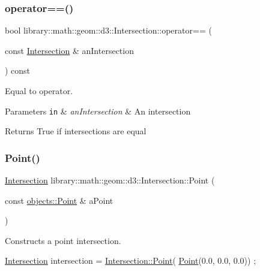 \subsubsection{\texorpdfstring{operator==()}{operator==()}}
{\footnotesize\ttfamily bool library\+::math\+::geom\+::d3\+::\+Intersection\+::operator== (\begin{DoxyParamCaption}\item[{const \hyperlink{classlibrary_1_1math_1_1geom_1_1d3_1_1_intersection}{Intersection} \&}]{an\+Intersection }\end{DoxyParamCaption}) const}



Equal to operator. 


\begin{DoxyParams}[1]{Parameters}
\mbox{\tt in}  & {\em an\+Intersection} & An intersection \\
\hline
\end{DoxyParams}
\begin{DoxyReturn}{Returns}
True if intersections are equal 
\end{DoxyReturn}
\mbox{\label{classlibrary_1_1math_1_1geom_1_1d3_1_1_intersection_a5155cc245bd2bf96a4296b0a8319c709}} 
\subsubsection{\texorpdfstring{Point()}{Point()}}
{\footnotesize\ttfamily \hyperlink{classlibrary_1_1math_1_1geom_1_1d3_1_1_intersection}{Intersection} library\+::math\+::geom\+::d3\+::\+Intersection\+::\+Point (\begin{DoxyParamCaption}\item[{const \hyperlink{classlibrary_1_1math_1_1geom_1_1d3_1_1objects_1_1_point}{objects\+::\+Point} \&}]{a\+Point }\end{DoxyParamCaption})\hspace{0.3cm}{\ttfamily [static]}}



Constructs a point intersection. 


\begin{DoxyCode}
\hyperlink{classlibrary_1_1math_1_1geom_1_1d3_1_1_intersection_ab800dbab95076a1d7ae47bd9d0887da3}{Intersection} intersection = \hyperlink{classlibrary_1_1math_1_1geom_1_1d3_1_1_intersection_a5155cc245bd2bf96a4296b0a8319c709}{Intersection::Point}(
      \hyperlink{classlibrary_1_1math_1_1geom_1_1d3_1_1_intersection_a5155cc245bd2bf96a4296b0a8319c709}{Point}(0.0, 0.0, 0.0)) ;
\end{DoxyCode}


